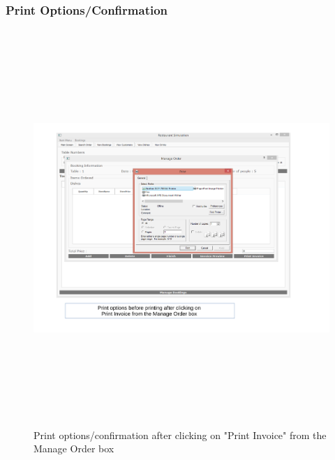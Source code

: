 \begin{landscape}
\subsubsection{Print Options/Confirmation}
\begin{figure}[H]
    \includegraphics[height = 15cm]{./Maintenance/images/screen14}
    \caption{Print options/confirmation after clicking on "Print Invoice" from the Manage Order box} \label{fig:screen14}
\end{figure}


\end{landscape}
